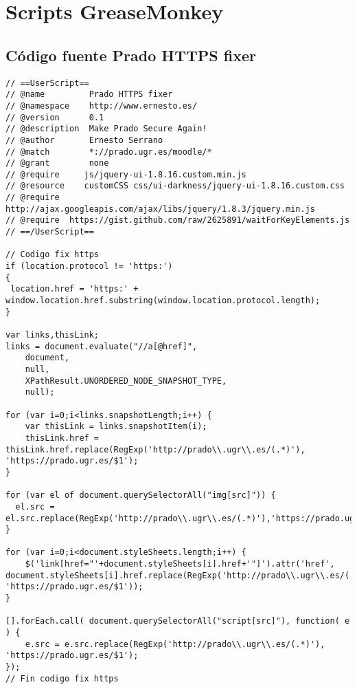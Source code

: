 \newpage
\section{Scripts GreaseMonkey}

\subsection{Código fuente Prado HTTPS fixer}

\begin{lstlisting}
// ==UserScript==
// @name         Prado HTTPS fixer
// @namespace    http://www.ernesto.es/
// @version      0.1
// @description  Make Prado Secure Again!
// @author       Ernesto Serrano
// @match        *://prado.ugr.es/moodle/*
// @grant        none
// @require     js/jquery-ui-1.8.16.custom.min.js
// @resource    customCSS css/ui-darkness/jquery-ui-1.8.16.custom.css
// @require  http://ajax.googleapis.com/ajax/libs/jquery/1.8.3/jquery.min.js
// @require  https://gist.github.com/raw/2625891/waitForKeyElements.js
// ==/UserScript==

// Codigo fix https
if (location.protocol != 'https:')
{
 location.href = 'https:' + window.location.href.substring(window.location.protocol.length);
}

var links,thisLink;
links = document.evaluate("//a[@href]",
    document,
    null,
    XPathResult.UNORDERED_NODE_SNAPSHOT_TYPE,
    null);

for (var i=0;i<links.snapshotLength;i++) {
    var thisLink = links.snapshotItem(i);
    thisLink.href = thisLink.href.replace(RegExp('http://prado\\.ugr\\.es/(.*)'), 'https://prado.ugr.es/$1');    
}

for (var el of document.querySelectorAll("img[src]")) {
  el.src = el.src.replace(RegExp('http://prado\\.ugr\\.es/(.*)'),'https://prado.ugr.es/$1');
}

for (var i=0;i<document.styleSheets.length;i++) {    
    $('link[href="'+document.styleSheets[i].href+'"]').attr('href', document.styleSheets[i].href.replace(RegExp('http://prado\\.ugr\\.es/(.*)'), 'https://prado.ugr.es/$1'));
}

[].forEach.call( document.querySelectorAll("script[src]"), function( e ) {
    e.src = e.src.replace(RegExp('http://prado\\.ugr\\.es/(.*)'), 'https://prado.ugr.es/$1');
});
// Fin codigo fix https
\end{lstlisting}	

